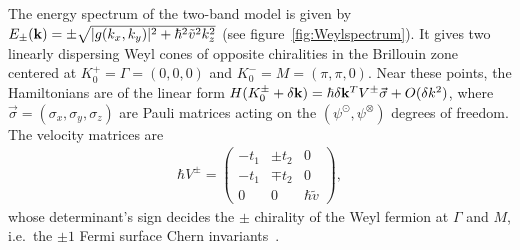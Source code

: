 The energy spectrum of the two-band model is given by $E_\pm({\bf k})=\pm\sqrt{|g(k_x,k_y)|^2+\hbar^2\tilde{v}^2k_z^2}$ (see figure~\ref{fig:Weylspectrum}).
It gives two linearly dispersing Weyl cones of opposite chiralities in the Brillouin zone centered at $K^+_0=\Gamma=(0,0,0)$ and $K^-_0=M=(\pi,\pi,0)$. Near these points, the Hamiltonians are of the linear form $H(K_0^\pm+\delta{\bf k})=\hbar\delta{\bf k}^TV^\pm\vec\sigma+O(\delta k^2)$, where $\vec\sigma=(\sigma_x,\sigma_y,\sigma_z)$ are Pauli matrices acting on the $(\psi^\odot,\psi^\otimes)$ degrees of freedom. The velocity matrices are \begin{align}\hbar V^\pm=\left(\begin{array}{ccc}-t_1&\pm t_2&0\\-t_1&\mp t_2&0\\0&0&\hbar\tilde{v}\end{array}\right),\end{align} whose determinant's %
sign decides the $\pm$ chirality of the Weyl fermion at $\Gamma$ and $M$, i.e.~the $\pm1$ Fermi surface Chern invariants~\cite{WanVishwanathSavrasovPRB11,Ashvin_Weyl_review,RMP}. %
